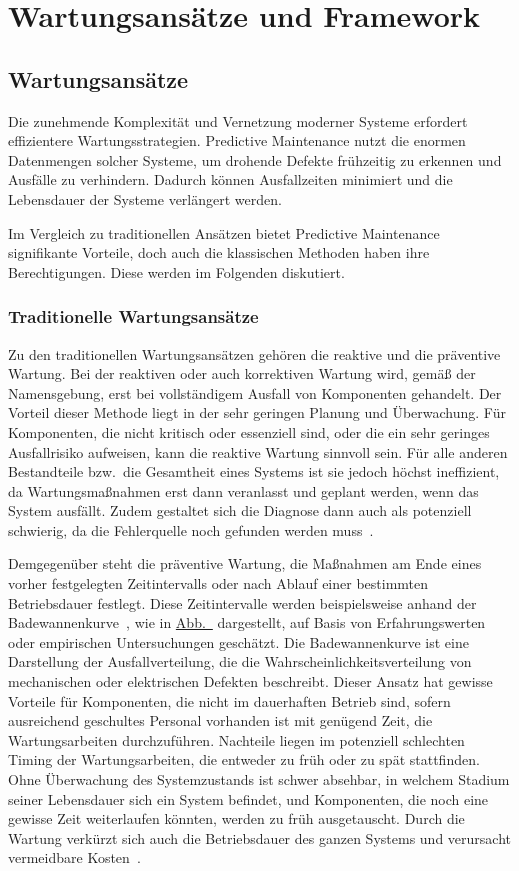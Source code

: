 \chapter{Wartungsansätze und Framework}\label{ch:pdm_theorie}
\section{Wartungsansätze}
Die zunehmende Komplexität und Vernetzung moderner Systeme erfordert effizientere Wartungsstrategien. Predictive Maintenance nutzt die
enormen Datenmengen solcher Systeme, um drohende Defekte frühzeitig zu erkennen und Ausfälle zu verhindern. Dadurch können
Ausfallzeiten minimiert und die Lebensdauer der Systeme verlängert werden.

Im Vergleich zu traditionellen Ansätzen bietet Predictive Maintenance signifikante Vorteile,
doch auch die klassischen Methoden haben ihre Berechtigungen. Diese werden im Folgenden diskutiert.

\subsection{Traditionelle Wartungsansätze}\label{sec:trad_maintenance}
Zu den traditionellen Wartungsansätzen gehören die reaktive und die präventive Wartung. Bei der reaktiven oder auch korrektiven
Wartung wird, gemäß der Namensgebung, erst bei vollständigem Ausfall von Komponenten gehandelt.
Der Vorteil dieser Methode liegt in der sehr geringen Planung und Überwachung. Für Komponenten,
die nicht kritisch oder essenziell sind, oder die ein sehr geringes Ausfallrisiko aufweisen, kann die reaktive Wartung sinnvoll sein.
Für alle anderen Bestandteile bzw.~die Gesamtheit eines Systems ist sie jedoch höchst ineffizient, da Wartungsmaßnahmen erst dann
veranlasst und geplant werden, wenn das System ausfällt. Zudem gestaltet sich die Diagnose dann auch als potenziell schwierig, da die
Fehlerquelle noch gefunden werden muss~\cite{Abdelli2022}.

Demgegenüber steht die präventive Wartung, die Maßnahmen am Ende eines vorher festgelegten Zeitintervalls oder nach Ablauf einer
bestimmten Betriebsdauer festlegt. Diese Zeitintervalle werden beispielsweise anhand der Badewannenkurve~\cite[S.~4]{Andrews2002},
wie in \hyperref[fig:bathtub]{Abb.~} dargestellt, auf Basis von Erfahrungswerten oder empirischen Untersuchungen geschätzt.
Die Badewannenkurve ist eine Darstellung der Ausfallverteilung, die die Wahrscheinlichkeitsverteilung von mechanischen oder elektrischen
Defekten beschreibt. Dieser Ansatz hat gewisse Vorteile für Komponenten, die nicht im dauerhaften Betrieb sind, sofern ausreichend geschultes Personal vorhanden
ist mit genügend Zeit, die Wartungsarbeiten durchzuführen. Nachteile liegen im potenziell schlechten Timing der Wartungsarbeiten, die
entweder zu früh oder zu spät stattfinden. Ohne Überwachung des Systemzustands ist schwer absehbar, in welchem Stadium seiner Lebensdauer
sich ein System befindet, und Komponenten, die noch eine gewisse Zeit weiterlaufen könnten, werden zu früh ausgetauscht. Durch die Wartung
verkürzt sich auch die Betriebsdauer des ganzen Systems und verursacht vermeidbare Kosten~\cite{Scheffer2004}.

